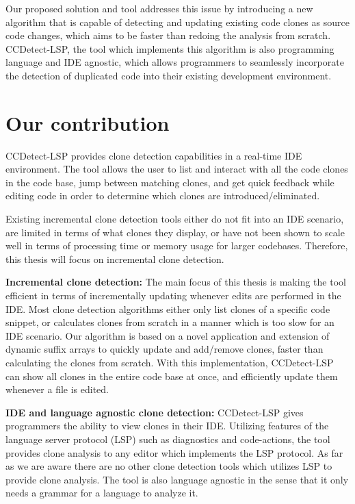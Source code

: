 Our proposed solution and tool addresses this issue by introducing a new algorithm that is
capable of detecting and updating existing code clones as source code changes, which aims
to be faster than redoing the analysis from scratch. CCDetect-LSP, the tool which
implements this algorithm is also programming language and IDE agnostic, which allows
programmers to seamlessly incorporate the detection of duplicated code into their existing
development environment.

\section{Our contribution}

CCDetect-LSP provides clone detection capabilities in a real-time IDE environment. The
tool allows the user to list and interact with all the code clones in the code base, jump
between matching clones, and get quick feedback while editing code in order to determine
which clones are introduced/eliminated.

Existing incremental clone detection tools either do not fit into an IDE scenario, are
limited in terms of what clones they display, or have not been shown to scale well in
terms of processing time or memory usage for larger codebases. Therefore, this thesis will
focus on incremental clone detection.

\textbf{Incremental clone detection:} The main focus of this thesis is making the tool
efficient in terms of incrementally updating whenever edits are performed in the IDE. Most
clone detection algorithms either only list clones of a specific code snippet, or
calculates clones from scratch in a manner which is too slow for an IDE scenario. Our
algorithm is based on a novel application and extension of dynamic suffix arrays to
quickly update and add/remove clones, faster than calculating the clones from scratch.
With this implementation, CCDetect-LSP can show all clones in the entire code base at
once, and efficiently update them whenever a file is edited.

\textbf{IDE and language agnostic clone detection:} CCDetect-LSP gives programmers the
ability to view clones in their IDE. Utilizing features of the language server protocol
(LSP) such as diagnostics and code-actions, the tool provides clone analysis to any editor
which implements the LSP protocol. As far as we are aware there are no other clone
detection tools which utilizes LSP to provide clone analysis. The tool is also language
agnostic in the sense that it only needs a grammar for a language to analyze it.

